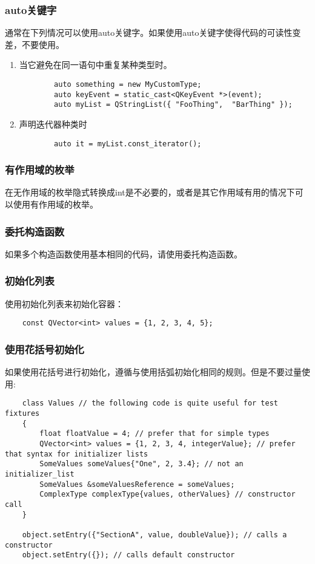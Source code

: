\subsubsection{auto关键字}
通常在下列情况可以使用auto关键字。如果使用auto关键字使得代码的可读性变差，不要使用。
\begin{enumerate}
	\item 当它避免在同一语句中重复某种类型时。
	\begin{lstlisting}
		auto something = new MyCustomType;
		auto keyEvent = static_cast<QKeyEvent *>(event);
		auto myList = QStringList({ "FooThing",  "BarThing" });
	\end{lstlisting}
	
	\item 声明迭代器种类时
	\begin{lstlisting}
		auto it = myList.const_iterator();
	\end{lstlisting}
\end{enumerate}
\subsubsection{有作用域的枚举}
在无作用域的枚举隐式转换成int是不必要的，或者是其它作用域有用的情况下可以使用有作用域的枚举。
\subsubsection{委托构造函数}
如果多个构造函数使用基本相同的代码，请使用委托构造函数。
\subsubsection{初始化列表}
使用初始化列表来初始化容器：
\begin{lstlisting}
	const QVector<int> values = {1, 2, 3, 4, 5};
\end{lstlisting}
\subsubsection{使用花括号初始化}
如果使用花括号进行初始化，遵循与使用括弧初始化相同的规则。但是不要过量使用:
\begin{lstlisting}
    class Values // the following code is quite useful for test fixtures
	{
		float floatValue = 4; // prefer that for simple types
		QVector<int> values = {1, 2, 3, 4, integerValue}; // prefer that syntax for initializer lists
		SomeValues someValues{"One", 2, 3.4}; // not an initializer_list
		SomeValues &someValuesReference = someValues;
		ComplexType complexType{values, otherValues} // constructor call
	}

	object.setEntry({"SectionA", value, doubleValue}); // calls a 	constructor
	object.setEntry({}); // calls default constructor
\end{lstlisting}
